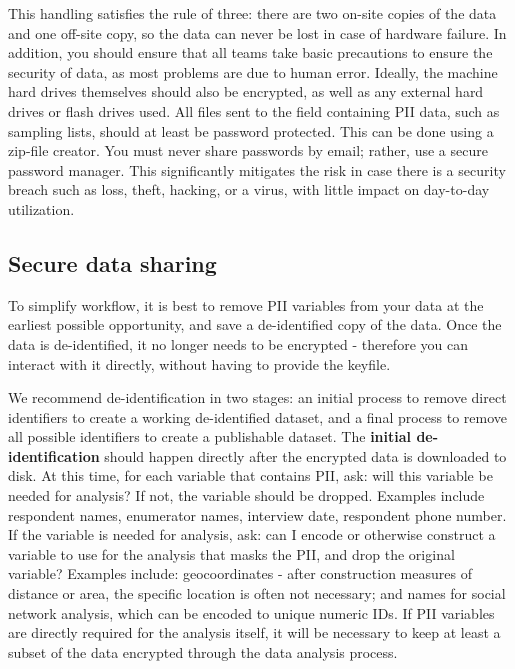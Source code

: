 {\begin{enumerate}
\end{enumerate}

This handling satisfies the rule of three: there are two on-site copies of the data and one off-site copy, so the data can never be lost in case of hardware failure. 
In addition, you should ensure that all teams take basic precautions to ensure the security of data, as most problems are due to human error.
Ideally, the machine hard drives themselves should also be encrypted, as well as any external hard drives or flash drives used. 
All files sent to the field containing PII data, such as sampling lists, should at least be password protected. This can be done using a zip-file creator.
You must never share passwords by email; rather, use a secure password manager. 
This significantly mitigates the risk in case there is a security breach such as loss, theft, hacking, or a virus, with little impact on day-to-day utilization.

\subsection{Secure data sharing}
To simplify workflow, it is best to remove PII variables from your data at the earliest possible opportunity, and save a de-identified copy of the data. 
Once the data is de-identified, it no longer needs to be encrypted - therefore you can interact with it directly, without having to provide the keyfile. 

We recommend de-identification in two stages: an initial process to remove direct identifiers to create a working de-identified dataset, and a final process to remove all possible identifiers to create a publishable dataset. 
The \textbf{initial de-identification} should happen directly after the encrypted data is downloaded to disk. At this time, for each variable that contains PII, ask: will this variable be needed for analysis?
If not, the variable should be dropped. Examples include respondent names, enumerator names, interview date, respondent phone number. 
If the variable is needed for analysis, ask: can I encode or otherwise construct a variable to use for the analysis that masks the PII, and drop the original variable? 
Examples include: geocoordinates - after construction measures of distance or area, the specific location is often not necessary; and names for social network analysis, which can be encoded to unique numeric IDs. 
If PII variables are directly required for the analysis itself, it will be necessary to keep at least a subset of the data encrypted through the data analysis process. 

}
